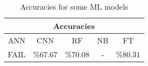 \begin{table}[h]
    \caption{Accuracies for some ML models }
    \begin{tabular}{||c c c c c||}
        \hline
        \multicolumn{5}{|c|}{Accuracies} \\
    \hline
    ANN & CNN & RF & NB & FT \\ [0.5ex] 
    \hline\hline
    FAIL  & \%67.67 & \%70.08 & - & \%80.31 \\ 
    \hline
\end{tabular}

\end{table}